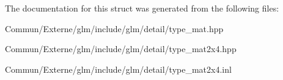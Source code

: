 The documentation for this struct was generated from the following files\+:\begin{DoxyCompactItemize}
\item 
Commun/\+Externe/glm/include/glm/detail/type\+\_\+mat.\+hpp\item 
Commun/\+Externe/glm/include/glm/detail/type\+\_\+mat2x4.\+hpp\item 
Commun/\+Externe/glm/include/glm/detail/type\+\_\+mat2x4.\+inl\end{DoxyCompactItemize}
